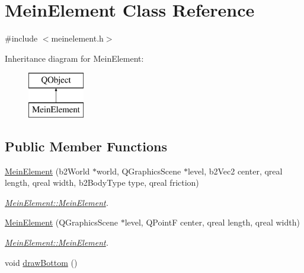 \hypertarget{class_mein_element}{}\section{Mein\+Element Class Reference}
\label{class_mein_element}


{\ttfamily \#include $<$meinelement.\+h$>$}

Inheritance diagram for Mein\+Element\+:\begin{figure}[H]
\begin{center}
\leavevmode
\includegraphics[height=2.000000cm]{class_mein_element}
\end{center}
\end{figure}
\subsection*{Public Member Functions}
\begin{DoxyCompactItemize}
\item 
\hyperlink{class_mein_element_a4a192d36a37deaaa20fb3aeefc7a2e12}{Mein\+Element} (b2\+World $\ast$world, Q\+Graphics\+Scene $\ast$level, b2\+Vec2 center, qreal length, qreal width, b2\+Body\+Type type, qreal friction)
\begin{DoxyCompactList}\small\item\em \hyperlink{class_mein_element_a4a192d36a37deaaa20fb3aeefc7a2e12}{Mein\+Element\+::\+Mein\+Element}. \end{DoxyCompactList}\item 
\hyperlink{class_mein_element_a0176c160758487042b6fca43d5141f8d}{Mein\+Element} (Q\+Graphics\+Scene $\ast$level, Q\+PointF center, qreal length, qreal width)
\begin{DoxyCompactList}\small\item\em \hyperlink{class_mein_element_a4a192d36a37deaaa20fb3aeefc7a2e12}{Mein\+Element\+::\+Mein\+Element}. \end{DoxyCompactList}\item 
void \hyperlink{class_mein_element_a711d5166f243d41f240990a3bf0bceff}{draw\+Bottom} ()
\end{DoxyCompactItemize}
